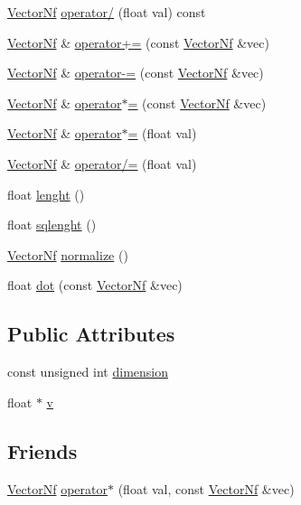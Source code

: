 \begin{DoxyCompactItemize}
\item 
\hyperlink{classh2_1_1_vector_nf}{Vector\-Nf} \hyperlink{classh2_1_1_vector_nf_a39dd14f4ead56a551c8e5a4d41a136fd}{operator/} (float val) const 
\item 
\hyperlink{classh2_1_1_vector_nf}{Vector\-Nf} \& \hyperlink{classh2_1_1_vector_nf_afaa22a6689e58847a636e5243fde1323}{operator+=} (const \hyperlink{classh2_1_1_vector_nf}{Vector\-Nf} \&vec)
\item 
\hyperlink{classh2_1_1_vector_nf}{Vector\-Nf} \& \hyperlink{classh2_1_1_vector_nf_a2c2a6865b35c891304a8ada88b684a8f}{operator-\/=} (const \hyperlink{classh2_1_1_vector_nf}{Vector\-Nf} \&vec)
\item 
\hyperlink{classh2_1_1_vector_nf}{Vector\-Nf} \& \hyperlink{classh2_1_1_vector_nf_a22eb67bc3bac1d3cdcc1095c2ab711d1}{operator$\ast$=} (const \hyperlink{classh2_1_1_vector_nf}{Vector\-Nf} \&vec)
\item 
\hyperlink{classh2_1_1_vector_nf}{Vector\-Nf} \& \hyperlink{classh2_1_1_vector_nf_a228308da81f3ba40db0cfe483c71b10f}{operator$\ast$=} (float val)
\item 
\hyperlink{classh2_1_1_vector_nf}{Vector\-Nf} \& \hyperlink{classh2_1_1_vector_nf_a60e9ac885ec7cafdacd016348854e199}{operator/=} (float val)
\item 
float \hyperlink{classh2_1_1_vector_nf_a58ef094b8d6662d0a676b4b5c851c8ce}{lenght} ()
\item 
float \hyperlink{classh2_1_1_vector_nf_a053c22cf1aacf282c93353ebfcd7edc4}{sqlenght} ()
\item 
\hyperlink{classh2_1_1_vector_nf}{Vector\-Nf} \hyperlink{classh2_1_1_vector_nf_a21556979672f3948283454c0d5519c68}{normalize} ()
\item 
float \hyperlink{classh2_1_1_vector_nf_a38c722c9c31538fae17e48129ab2e92c}{dot} (const \hyperlink{classh2_1_1_vector_nf}{Vector\-Nf} \&vec)
\end{DoxyCompactItemize}
\subsection*{Public Attributes}
\begin{DoxyCompactItemize}
\item 
const unsigned int \hyperlink{classh2_1_1_vector_nf_a34f9fcfc677b4598ab1d7449ff4bfc6b}{dimension}
\item 
float $\ast$ \hyperlink{classh2_1_1_vector_nf_aa33fe11e47901cec99fdb34aa48f3f3e}{v}
\end{DoxyCompactItemize}
\subsection*{Friends}
\begin{DoxyCompactItemize}
\item 
\hyperlink{classh2_1_1_vector_nf}{Vector\-Nf} \hyperlink{classh2_1_1_vector_nf_aaa7757f97532942a1cdf19e785d39c3d}{operator$\ast$} (float val, const \hyperlink{classh2_1_1_vector_nf}{Vector\-Nf} \&vec)
\end{DoxyCompactItemize}


